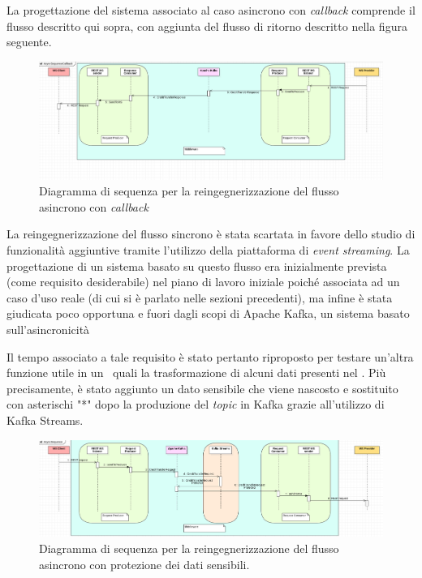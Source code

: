 La progettazione del sistema associato al caso asincrono con \textit{callback} comprende il flusso descritto qui sopra, con aggiunta del flusso di ritorno descritto nella figura seguente.
\bigskip
\begin{figure}[h]
  \begin{center}
    \includegraphics[width=\textwidth]{images/ac_sequence.png}
    \caption{Diagramma di sequenza  per la reingegnerizzazione del flusso asincrono con \textit{callback}}
  \end{center}
\end{figure}

La reingegnerizzazione del flusso sincrono è stata scartata in favore dello studio di funzionalità aggiuntive tramite l'utilizzo della piattaforma di \textit{event streaming}.
La progettazione di un sistema basato su questo flusso era inizialmente prevista (come requisito desiderabile) nel piano di lavoro iniziale poiché associata ad un caso d'uso reale (di cui si è parlato nelle sezioni precedenti), ma infine è stata giudicata poco opportuna e fuori dagli scopi di Apache Kafka, un sistema basato sull'asincronicità

Il tempo associato a tale requisito è stato pertanto riproposto per testare un'altra funzione utile in un \middleware\, quali la trasformazione di alcuni dati presenti nel .
Più precisamente, è stato aggiunto un dato sensibile che viene nascosto e sostituito con asterischi "*" dopo la produzione del \textit{topic} in Kafka grazie all'utilizzo di Kafka Streams.
\bigskip
\begin{figure}[h]
  \begin{center}
    \includegraphics[width=\textwidth]{images/ap_sequence.png}
    \caption{Diagramma di sequenza  per la reingegnerizzazione del flusso asincrono con protezione dei dati sensibili.}
  \end{center}
\end{figure}

